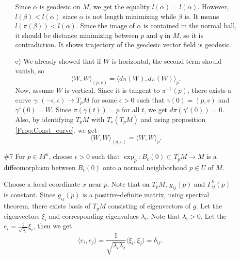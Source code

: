 \documentclass[a4paper, 12pt]{article}
\theoremstyle{Mydefinition}
\theoremstyle{Mytheorem}
\begin{document}
\begin{enumerate}
\begin{enumerate}
        Since $\alpha$ is geodesic on $M$, we get the equality $l(\overline{\alpha}) = l(\alpha)$. However, $l(\beta)<l(\overline{\alpha})$ since $\overline{\alpha}$ is not length minimizing while $\beta$ is. It means $l(\pi(\beta))<l(\alpha)$. Since the image of $\alpha$ is contained in the normal ball, it should be distance minimizing between $p$ and $q$ in $M$, so it is contradiction. It shows trajectory of the geodesic vector field is geodesic.
        
        \item[e)] We already showed that if $W$ is horizontal, the second term should vanish, so 
        \begin{equation}
            \langle W, W\rangle_{(p,v)} = \langle d\pi(W), d\pi(W)\rangle_p.
        \end{equation}
        Now, assume $W$ is vertical. Since it is tangent to $\pi^{-1}(p)$, there exists a curve $\gamma:(-\epsilon, \epsilon)\rightarrow T_pM$ for some $\epsilon>0$ such that $\gamma(0) = (p,v)$ and $\gamma'(0) = W$. Since $\pi(\gamma(t)) = p$ for all $t$, we get $d\pi(\gamma'(0)) = 0$. Also, by identifying $T_pM$ with $T_v(T_pM)$ and using proposition \ref{Prop:Const_curve}, we get
        \begin{equation}
            \langle W, W\rangle_{(p,v)} = \langle W, W\rangle_p.
        \end{equation}
    \end{enumerate}
    
    \item[\#7] For $p\in M^n$, choose $\epsilon>0$ such that $\exp_p:B_\epsilon(0)\subset T_p M\rightarrow M$ is a diffeomorphism between $B_\epsilon(0)$ onto a normal neighborhood $p\in U$ of $M$.
    
    Choose a local coordinate $x$ near $p$. Note that on $T_pM$, $g_{ij}(p)$ and $\Gamma_{ij}^k(p)$ is constant. Since $g_{ij}(p)$ is a positive-definite matrix, using spectral theorem, there exists basis of $T_p M$ consisting of eigenvectors of $g$. Let the eigenvectors $\xi_i$ and corresponding eigenvalues $\lambda_i$. Note that $\lambda_i>0$. Let the $e_i = \frac{1}{\sqrt{\lambda_i}}\xi_i$, then we get
    \begin{equation}
        \langle e_i, e_j\rangle = \frac{1}{\sqrt{\lambda_i\lambda_j}}\langle \xi_i, \xi_j\rangle = \delta_{ij}.
    \end{equation}
    

\end{enumerate}
\end{document}
